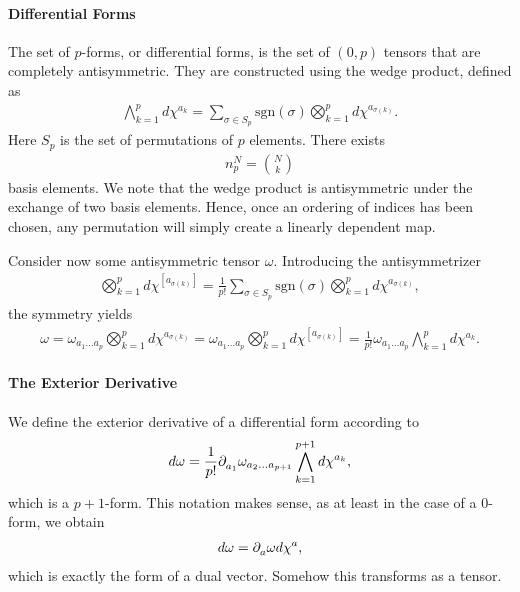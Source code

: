 \paragraph{Differential Forms}
The set of $p$-forms, or differential forms, is the set of $(0, p)$ tensors that are completely antisymmetric. They are constructed using the wedge product, defined as
\begin{align*}
	\bigwedge\limits_{k = 1}^{p}d\chi^{a_{k}} = \sum\limits_{\sigma\in S_{p}}\text{sgn}(\sigma)\bigotimes_{k = 1}^{p}d\chi^{a_{\sigma(k)}}.
\end{align*}
Here $S_{p}$ is the set of permutations of $p$ elements. There exists
\begin{align*}
	n_{p}^{N} = {N\choose k}
\end{align*}
basis elements. We note that the wedge product is antisymmetric under the exchange of two basis elements. Hence, once an ordering of indices has been chosen, any permutation will simply create a linearly dependent map.

Consider now some antisymmetric tensor $\omega$. Introducing the antisymmetrizer
\begin{align*}
\bigotimes_{k = 1}^{p}d\chi^{[a_{\sigma(k)}]} = \frac{1}{p!}\sum\limits_{\sigma\in S_{p}}\text{sgn}(\sigma)\bigotimes_{k = 1}^{p}d\chi^{a_{\sigma(k)}},
\end{align*}
the symmetry yields
\begin{align*}
\omega = \omega_{a_{1}\dots a_{p}}\bigotimes_{k = 1}^{p}d\chi^{a_{\sigma(k)}} = \omega_{a_{1}\dots a_{p}}\bigotimes_{k = 1}^{p}d\chi^{[a_{\sigma(k)}]} = \frac{1}{p!}\omega_{a_{1}\dots a_{p}}\bigwedge\limits_{k = 1}^{p}d\chi^{a_{k}}.
\end{align*}

\paragraph{The Exterior Derivative}
We define the exterior derivative of a differential form according to
\begin{align*}
	d\omega = \frac{1}{p!}\partial^{}_{a_{1}}{\omega_{a_{2}\dots a_{p + 1}}}\bigwedge\limits_{k = 1}^{p + 1}d\chi^{a_{k}},
\end{align*}
which is a $p + 1$-form. This notation makes sense, as at least in the case of a $0$-form, we obtain
\begin{align*}
	d\omega = \partial^{}_{a}{\omega}d\chi^{a},
\end{align*}
which is exactly the form of a dual vector. Somehow this transforms as a tensor.


